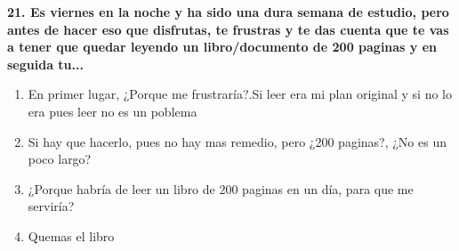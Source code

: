 \documentclass{article}
\begin{document}
\textbf{21. Es viernes en la noche y ha sido una dura semana de estudio, pero antes de hacer eso que disfrutas, te frustras y te das cuenta
que te vas a tener que quedar leyendo un libro/documento de 200 paginas  y en seguida tu...} 
 \begin{enumerate}[label=(\Alph*)]
 \item En primer lugar, ¿Porque me frustraría?.Si leer era mi plan original  y si no lo era pues leer no es un poblema
 \item Si hay que hacerlo, pues no hay mas remedio, pero ¿200 paginas?, ¿No es un poco largo?
 \item ¿Porque habría de leer un libro de 200 paginas en un día, para que me serviría?
 \item Quemas el libro 
 \end{enumerate}
\end{document}
